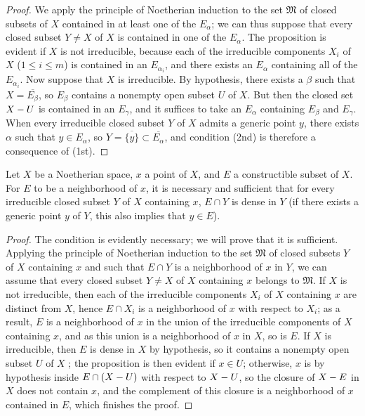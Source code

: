 \begin{proof}
We apply the principle of Noetherian induction  to the set $\mathfrak{M}$ of closed subsets of $X$ contained in at least one of the $E_\alpha$; we can thus suppose that every closed subset $Y\neq X$ of $X$ is contained in one of the $E_\alpha$.
The proposition is evident if $X$ is not irreducible, because each of the irreducible components $X_i$ of $X$ ($1\leq i\leq m$) is contained in an $E_{\alpha_i}$, and there exists an $E_\alpha$ containing all of the $E_{\alpha_i}$.
Now suppose that $X$ is irreducible.
By hypothesis, there exists a $\beta$ such that $X=\overline{E_\beta}$, so  $E_\beta$ contains a nonempty open subset $U$ of $X$.
But then the closed set $X- U$ is contained in an $E_\gamma$, and it suffices to take an $E_\alpha$ containing $E_\beta$ and $E_\gamma$.
When every irreducible closed subset $Y$ of $X$
admits a generic point $y$, there exists $\alpha$ such that $y\in E_\alpha$, so $Y=\overline{\{y\}}\subset\overline{E_\alpha}$, and condition (2nd) is therefore a consequence of (1st).
\end{proof}

\begin{proposition}[9.2.5]
\label{0.9.2.5}
Let $X$ be a Noetherian space, $x$ a point of $X$, and $E$ a constructible subset of $X$.
For $E$ to be a neighborhood of $x$, it is necessary and sufficient that for every irreducible closed subset $Y$ of $X$ containing $x$, $E\cap Y$ is dense in $Y$ (if there exists a generic point $y$ of $Y$, this also implies  that $y\in E$).
\end{proposition}

\begin{proof}
The condition is evidently necessary; we will prove that it is sufficient.
Applying the principle of Noetherian induction to the set $\mathfrak{M}$ of closed subsets $Y$ of $X$ containing $x$ and such that $E\cap Y$ is a neighborhood of $x$ in $Y$, we can assume that every closed subset $Y\neq X$ of $X$ containing $x$ belongs to $\mathfrak{M}$.
If $X$ is not irreducible, then each of the irreducible components $X_i$ of $X$ containing $x$ are distinct from $X$, hence $E\cap X_i$ is a neighborhood of $x$ with respect to $X_i$; as a result, $E$ is a neighborhood of $x$ in the union of the irreducible components of $X$ containing $x$, and as this union is a neighborhood of $x$ in $X$, so is $E$.
If $X$ is irreducible, then $E$ is dense in $X$ by hypothesis, so it contains a nonempty open subset $U$ of $X$ ; the proposition is then evident if $x\in U$; otherwise, $x$ is by hypothesis inside $E\cap(X- U)$ with respect to $X- U$, so the closure of $X- E$ in $X$ does not contain $x$, and the complement of this closure is a neighborhood of $x$ contained in $E$, which finishes the proof.
\end{proof}

